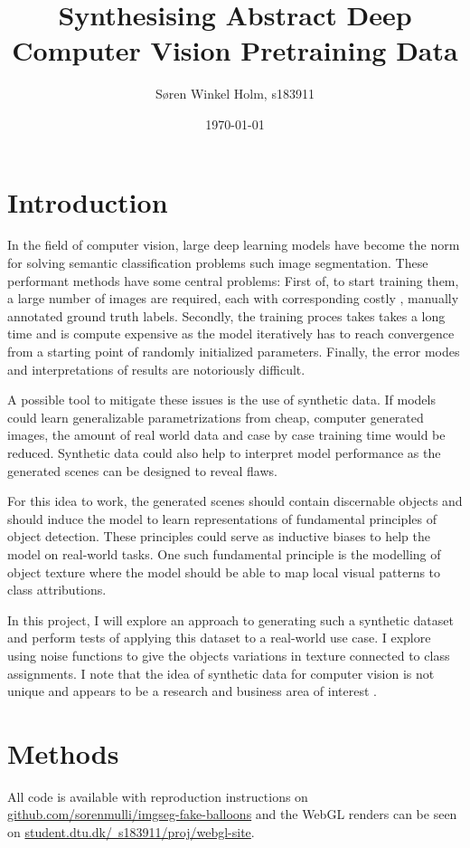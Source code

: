 \documentclass[12pt,fleqn]{article}
\title{Synthesising Abstract Deep Computer Vision Pretraining Data}
\author{Søren Winkel Holm, s183911}
\date{\today}
\begin{document}
\maketitle
\thispagestyle{fancy}
\tableofcontents
\newpage

\section{Introduction}%
\label{sec:intro}
In the field of computer vision, large deep learning models have become the norm for solving semantic classification problems such image segmentation.
These performant methods have some central problems:
First of, to start training them, a large number of images are required, each with corresponding costly , manually annotated ground truth labels.
Secondly, the training proces takes takes a long time and is compute expensive as the model iteratively has to reach convergence from a starting point of randomly initialized parameters.
Finally, the error modes and interpretations of results are notoriously difficult.

A possible tool to mitigate these issues is the use of synthetic data.
If models could learn generalizable parametrizations from cheap, computer generated images, the amount of real world data and case by case training time would be reduced.
Synthetic data could also help to interpret model performance as the generated scenes can be designed to reveal flaws.

For this idea to work, the generated scenes should contain discernable objects and should induce the model to learn representations of fundamental principles of object detection.
These principles could serve as inductive biases to help the model on real-world tasks.
One such fundamental principle is the modelling of object texture where the model should be able to map local visual patterns to class attributions.

In this project, I will explore an approach to generating such a synthetic dataset and perform tests of applying this dataset to a real-world use case.
I explore using noise functions to give the objects variations in texture connected to class assignments.
I note that the idea of synthetic data for computer vision is not unique and appears to be a research and business area of interest \cite{data2022break}.

\section{Methods}%
\label{sec:method}
All code is available with reproduction instructions on \href{https://github.com/sorenmulli/imgseg-fake-balloons}{github.com/sorenmulli/imgseg-fake-balloons} and the WebGL renders can be seen on \href{https://www.student.dtu.dk/~s183911/proj/webgl-site/index.html}{student.dtu.dk/~s183911/proj/webgl-site}.
\end{document}
